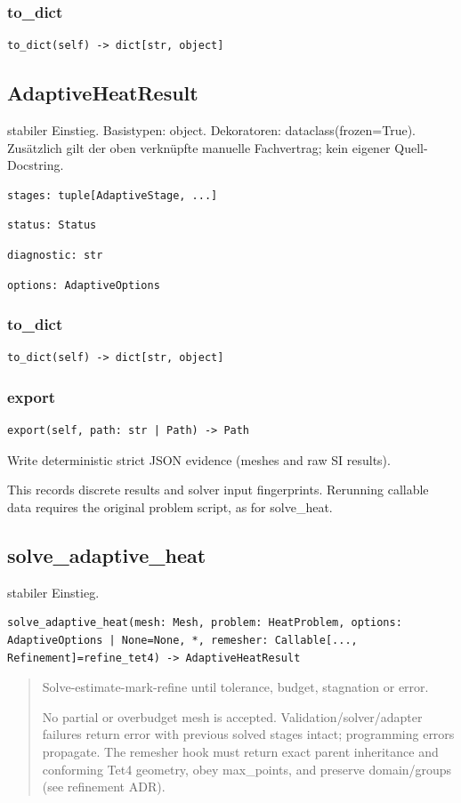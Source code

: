 \subsubsection*{to\_dict}
\begin{lstlisting}
to_dict(self) -> dict[str, object]
\end{lstlisting}
\subsection{AdaptiveHeatResult}
stabiler Einstieg.
Basistypen: object. Dekoratoren: dataclass(frozen=True).
Zusätzlich gilt der oben verknüpfte manuelle Fachvertrag; kein eigener Quell-Docstring.
\begin{lstlisting}
stages: tuple[AdaptiveStage, ...]
\end{lstlisting}
\begin{lstlisting}
status: Status
\end{lstlisting}
\begin{lstlisting}
diagnostic: str
\end{lstlisting}
\begin{lstlisting}
options: AdaptiveOptions
\end{lstlisting}
\subsubsection*{to\_dict}
\begin{lstlisting}
to_dict(self) -> dict[str, object]
\end{lstlisting}
\subsubsection*{export}
\begin{lstlisting}
export(self, path: str | Path) -> Path
\end{lstlisting}
Write deterministic strict JSON evidence (meshes and raw SI results).\par This records discrete results and solver input fingerprints. Rerunning callable data requires the original problem script, as for solve\_heat.
\subsection{solve\_adaptive\_heat}
stabiler Einstieg.
\begin{lstlisting}
solve_adaptive_heat(mesh: Mesh, problem: HeatProblem, options: AdaptiveOptions | None=None, *, remesher: Callable[..., Refinement]=refine_tet4) -> AdaptiveHeatResult
\end{lstlisting}
\begin{quote}
Solve-estimate-mark-refine until tolerance, budget, stagnation or error.\par No partial or overbudget mesh is accepted. Validation/solver/adapter failures return error with previous solved stages intact; programming errors propagate. The remesher hook must return exact parent inheritance and conforming Tet4 geometry, obey max\_points, and preserve domain/groups (see refinement ADR).
\end{quote}
